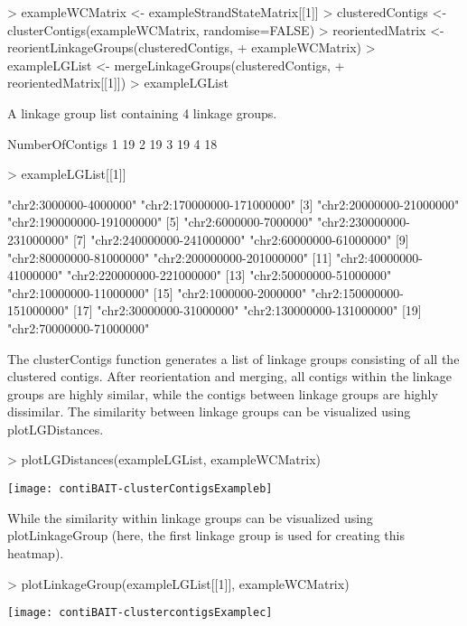 \documentclass{article}
\begin{document}
\begin{Schunk}
\begin{Sinput}
> exampleWCMatrix <- exampleStrandStateMatrix[[1]]
> clusteredContigs <- clusterContigs(exampleWCMatrix, randomise=FALSE)
> reorientedMatrix <- reorientLinkageGroups(clusteredContigs,
+  exampleWCMatrix)
> exampleLGList <- mergeLinkageGroups(clusteredContigs,
+ reorientedMatrix[[1]])
> exampleLGList
\end{Sinput}
\begin{Soutput}
A linkage group list containing  4  linkage groups.

  NumberOfContigs
1              19
2              19
3              19
4              18
\end{Soutput}
\begin{Sinput}
> exampleLGList[[1]]
\end{Sinput}
\begin{Soutput}
 [1] "chr2:3000000-4000000"     "chr2:170000000-171000000"
 [3] "chr2:20000000-21000000"   "chr2:190000000-191000000"
 [5] "chr2:6000000-7000000"     "chr2:230000000-231000000"
 [7] "chr2:240000000-241000000" "chr2:60000000-61000000"  
 [9] "chr2:80000000-81000000"   "chr2:200000000-201000000"
[11] "chr2:40000000-41000000"   "chr2:220000000-221000000"
[13] "chr2:50000000-51000000"   "chr2:10000000-11000000"  
[15] "chr2:1000000-2000000"     "chr2:150000000-151000000"
[17] "chr2:30000000-31000000"   "chr2:130000000-131000000"
[19] "chr2:70000000-71000000"  
\end{Soutput}
\end{Schunk}


The clusterContigs function generates a list of linkage groups consisting of all the clustered contigs.  After reorientation and merging, all contigs within the linkage groups are highly similar, while the contigs between linkage groups are highly dissimilar.  The similarity between linkage groups can be visualized using plotLGDistances.

\begin{Schunk}
\begin{Sinput}
> plotLGDistances(exampleLGList, exampleWCMatrix)
\end{Sinput}
\end{Schunk}
\texttt{[image: contiBAIT-clusterContigsExampleb]}


While the similarity within linkage groups can be visualized using plotLinkageGroup (here, the first linkage group is used for creating this heatmap).

\begin{Schunk}
\begin{Sinput}
> plotLinkageGroup(exampleLGList[[1]], exampleWCMatrix)
\end{Sinput}
\end{Schunk}
\texttt{[image: contiBAIT-clustercontigsExamplec]}
\end{document}
